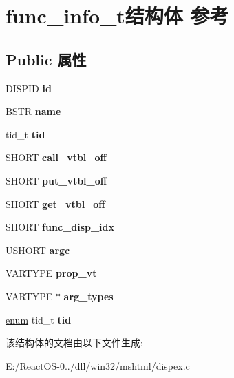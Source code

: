 \hypertarget{structfunc__info__t}{}\section{func\+\_\+info\+\_\+t结构体 参考}
\label{structfunc__info__t}
\subsection*{Public 属性}
\begin{DoxyCompactItemize}
\item 
\mbox{\label{structfunc__info__t_a4dd0b94e74aff720472b3ba78e00ec8a}} 
D\+I\+S\+P\+ID {\bfseries id}
\item 
\mbox{\label{structfunc__info__t_a7fa6863de96013416266936b6942318c}} 
B\+S\+TR {\bfseries name}
\item 
\mbox{\label{structfunc__info__t_a07ddaf1d24060390ccd6061f8812f195}} 
tid\+\_\+t {\bfseries tid}
\item 
\mbox{\label{structfunc__info__t_ad94a3de3734ac6ee9919465fe223c38d}} 
S\+H\+O\+RT {\bfseries call\+\_\+vtbl\+\_\+off}
\item 
\mbox{\label{structfunc__info__t_ad4073bbf2b00ae357ae069982eea969d}} 
S\+H\+O\+RT {\bfseries put\+\_\+vtbl\+\_\+off}
\item 
\mbox{\label{structfunc__info__t_a85c3f9f85ef73b1a641f35b7bdfebb0e}} 
S\+H\+O\+RT {\bfseries get\+\_\+vtbl\+\_\+off}
\item 
\mbox{\label{structfunc__info__t_a88f94ea2c13ff1bdf6fda844e8abf375}} 
S\+H\+O\+RT {\bfseries func\+\_\+disp\+\_\+idx}
\item 
\mbox{\label{structfunc__info__t_aac223631ba1a3b835c4507a46a79befc}} 
U\+S\+H\+O\+RT {\bfseries argc}
\item 
\mbox{\label{structfunc__info__t_a0b1b06d738b939fba71240d28e210a84}} 
V\+A\+R\+T\+Y\+PE {\bfseries prop\+\_\+vt}
\item 
\mbox{\label{structfunc__info__t_ace717e0e8e19d80c408c588962a5a011}} 
V\+A\+R\+T\+Y\+PE $\ast$ {\bfseries arg\+\_\+types}
\item 
\mbox{\label{structfunc__info__t_a3feacc371612f9c9e1c01982a1835bb7}} 
\hyperlink{interfaceenum}{enum} tid\+\_\+t {\bfseries tid}
\end{DoxyCompactItemize}


该结构体的文档由以下文件生成\+:\begin{DoxyCompactItemize}
\item 
E\+:/\+React\+O\+S-\/0../dll/win32/mshtml/dispex.\+c\end{DoxyCompactItemize}
